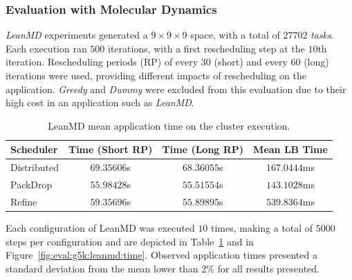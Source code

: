 \subsubsection{Evaluation with Molecular Dynamics} \label{sec:cluster:md}

\textit{LeanMD} experiments generated a $9\times9\times9$ space, with a total of $27702$ \textit{tasks}.
Each execution ran $500$ iterations, with a first rescheduling step at the $10$th iteration. 
Rescheduling periods (RP) of every $30$ (short) and every $60$ (long) iterations were used, providing different impacts of rescheduling on the application.
\textit{Greedy} and \textit{Dummy} were excluded from this evaluation due to their high cost in an application such as \textit{LeanMD}. 

\begin{table}[!ht]
	\centering
	\caption{LeanMD mean application time on the cluster execution.}	
	\begin{tabular}{l|c c c}
	Scheduler & Time (Short RP) & Time (Long RP) & Mean LB Time \\ \hline
	Distributed & $69.35606$s & $68.36055$s & $167.0444$ms \\ 
	PackDrop & $55.98428$s & $55.51554$s & $143.1028$ms \\ 
	Refine & $59.35696$s & $55.89895$s & $539.8364$ms \\ 
	\end{tabular}
	\label{tab:eval:g5k:leanmd:time} 
\end{table}




Each configuration of LeanMD was executed $10$ times, making a total of $5000$ steps per configuration and are depicted in Table~\ref{tab:eval:g5k:leanmd:time} and in Figure~\ref{fig:eval:g5k:leanmd:time}.
Observed application times presented a standard deviation from the mean lower than $2\%$ for all results presented.

